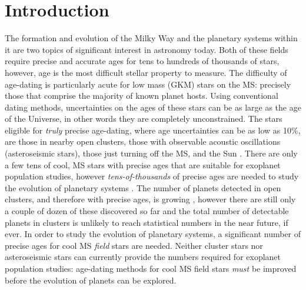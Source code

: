 \section{Introduction}
\label{section:intro}

The formation and evolution of the Milky Way and the planetary systems within
it are two topics of significant interest in astronomy today.
Both of these fields require precise and accurate ages for tens to hundreds of
thousands of stars, however, age is the most difficult stellar property to
measure.
The difficulty of age-dating is particularly acute for low mass (GKM) stars on
the MS: precisely those that comprise the majority of known planet hosts.
Using conventional dating methods, uncertainties on the ages of these stars
can be as large as the age of the Universe, in other words they are completely
unconstrained.
The stars eligible for {\it truly} precise age-dating, where age uncertainties
can be as low as 10\%, are those in nearby open clusters, those with
observable acoustic oscillations (asteroseismic stars), those just turning off
the MS, and the Sun
\citep[see][for a review of stellar ages]{soderblom2010}.
There are only a few tens of cool, MS stars with precise ages that are
suitable for exoplanet population studies, however {\it tens-of-thousands} of
precise ages are needed to study the evolution of planetary systems
\citep[\eg][]{petigura2013, foreman-mackey2014, veras2015, burke2015}.
The number of planets detected in open clusters, and therefore with precise
ages, is growing \citep[\eg][]{mann2017, rizzuto2018, vanderburg2018,
mann2018}, however there are still only a couple of dozen of these discovered
so far and the total number of detectable planets in clusters is unlikely to
reach statistical numbers in the near future, if ever.
In order to study the evolution of planetary systems, a significant number of
precise ages for cool MS {\it field} stars are needed.
Neither cluster stars nor asteroseismic stars can currently provide the
numbers required for exoplanet population studies: age-dating methods for cool
MS field stars {\it must} be improved before the evolution of planets can be
explored.

